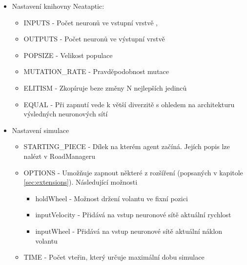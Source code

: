 \begin{itemize}
	\item Nastavení knihovny Neataptic:
	\begin{itemize}
		\item INPUTS - Počet neuronů ve vstupní vrstvě ,
		\item OUTPUTS - Počet neuronů ve výstupní vrstvě
		\item POPSIZE - Velikost populace
		\item MUTATION\_RATE - Pravděpodobnost mutace
		\item ELITISM - Zkopíruje beze změny N nejlepších jedinců
		\item EQUAL - Při zapnutí vede k větší diverzitě s ohledem na architekturu výsledných neuronových sítí
	\end{itemize}
	\item Nastavení simulace
	\begin{itemize}
		\item STARTING\_PIECE - Dílek na kterém agent začíná. Jejích popis lze nalézt v RoadManageru
		\item OPTIONS - Umožňuje zapnout některé z rozšíření (popsaných v kapitole \ref{sec:extensions}). Následující možnosti
		\begin{itemize}
			\item holdWheel - Možnost držení volantu ve fixní pozici
			\item inputVelocity - Přidává na vstup neuronové sítě aktuální rychlost
			\item inputWheel - Přidává na vstup neuronové sítě aktuální náklon volantu
		\end{itemize}
		\item TIME - Počet vteřin, který určuje maximální dobu simulace
	\end{itemize}
\end{itemize}

